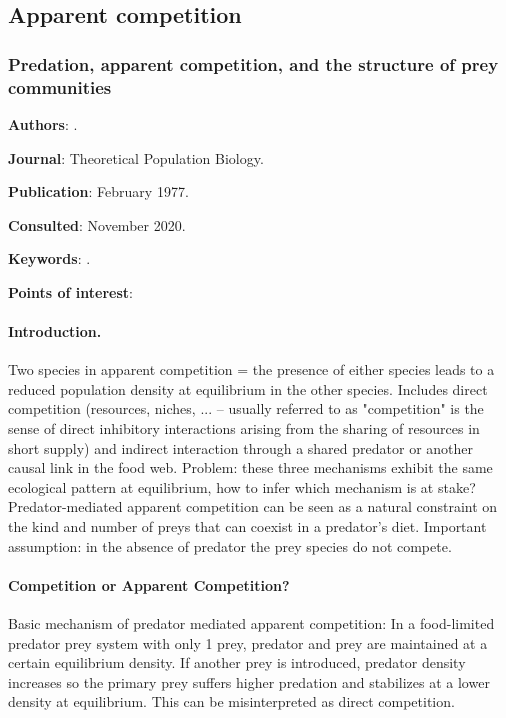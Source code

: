\documentclass[12pt,a4paper]{article}
\begin{document}
\subsection*{Apparent competition}

\subsubsection*{Predation, apparent competition, and the structure of prey communities}

\textbf{Authors}: \cite{holt1977predation}.

\textbf{Journal}: Theoretical Population Biology.

\textbf{Publication}: February 1977.

\textbf{Consulted}: November 2020.

\textbf{Keywords}: .

\textbf{Points of interest}:

\paragraph{Introduction.} Two species in apparent competition = the presence of either species leads to a reduced population density at equilibrium in the other species.
Includes direct competition (resources, niches, ... -- usually referred to as "competition" is the sense of direct inhibitory interactions arising from the sharing of resources in short supply) and indirect interaction through a shared predator or another causal link in the food web.
Problem: these three mechanisms exhibit the same ecological pattern at equilibrium, how to infer which mechanism is at stake?
Predator-mediated apparent competition can be seen as a natural constraint on the kind and number of preys that can coexist in a predator's diet.
Important assumption: in the absence of predator the prey species do not compete.

\paragraph{Competition or Apparent Competition?} Basic mechanism of predator mediated apparent competition: In a food-limited predator prey system with only 1 prey, predator and prey are maintained at a certain equilibrium density. If another prey is introduced, predator density increases so the primary prey suffers higher predation and stabilizes at a lower density at equilibrium. This can be misinterpreted as direct competition.
\end{document}
